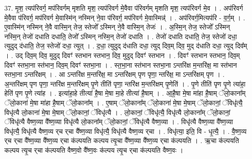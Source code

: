 \documentclass[17pt]{extarticle}
\begin{document}
37. मृ॒श॒ त्यप॑रिवर्ग॒ मप॑रिवर्गम् मृशति मृश॒ त्यप॑रिवर्ग मे॒वैवा प॑रिवर्गम् मृशति मृश॒ त्यप॑रिवर्ग मे॒व । . अप॑रिवर्ग मे॒वैवा प॑रिवर्ग॒ मप॑रिवर्ग मे॒वास्मि॑न् नस्मिन् ने॒वा प॑रिवर्ग॒ मप॑रिवर्ग मे॒वास्मिन्न्॑ । . अप॑रिवर्ग॒मित्यप॑रि - व॒र्ग॒म् । . ए॒वास्मि॑न् नस्मिन् ने॒वै वास्मि॒न् तेज॒ स्तेजो᳚ ऽस्मिन् ने॒वै वास्मि॒न् तेजः॑ । . अ॒स्मि॒न् तेज॒ स्तेजो᳚ ऽस्मिन् नस्मि॒न् तेजो॑ दधाति दधाति॒ तेजो᳚ ऽस्मिन् नस्मि॒न् तेजो॑ दधाति । . तेजो॑ दधाति दधाति॒ तेज॒ स्तेजो॑ दधा॒ त्युदुद् द॑धाति॒ तेज॒ स्तेजो॑ दधा॒ त्युत् । . द॒धा॒ त्युदुद् द॑धाति दधा॒ त्युद् दिव॒म् दिव॒ मुद् द॑धाति दधा॒ त्युद् दिव᳚म् । . उद् दिव॒म् दिव॒ मुदुद् दिवꣳ॑ स्तभान स्तभान॒ दिव॒ मुदुद् दिवꣳ॑ स्तभान । . दिवꣳ॑ स्तभान स्तभान॒ दिव॒म् दिवꣳ॑ स्तभा॒ना स्त॑भान॒ दिव॒म् दिवꣳ॑ स्तभा॒ना । . स्त॒भा॒ना स्त॑भान स्तभा॒ना ऽन्तरि॑क्ष म॒न्तरि॑क्ष॒ मा स्त॑भान स्तभा॒ना ऽन्तरि॑क्षम् । . आ ऽन्तरि॑क्ष म॒न्तरि॑क्ष॒ मा ऽन्तरि॑क्षम् पृण पृणा॒ न्तरि॑क्ष॒ मा ऽन्तरि॑क्षम् पृण । . अ॒न्तरि॑क्षम् पृण पृणा॒ न्तरि॑क्ष म॒न्तरि॑क्षम् पृ॒णे तीति॑ पृणा॒ न्तरि॑क्ष म॒न्तरि॑क्षम् पृ॒णेति॑ । . पृ॒णे तीति॑ पृण पृ॒णे त्या॑हा॒ हेति॑ पृण पृ॒णे त्या॑ह । . इत्या॑हा॒हे तीत्या॑ है॒षा मे॒षा मा॒हे तीत्या॑ है॒षाम् । . आ॒है॒षा मे॒षा मा॑हा है॒षाम् ॅलो॒काना᳚म् ॅलो॒काना॑ मे॒षा मा॑हा है॒षाम् ॅलो॒काना᳚म् । . ए॒षाम् ॅलो॒काना᳚म् ॅलो॒काना॑ मे॒षा मे॒षाम् ॅलो॒कानां॒ ॅविधृ॑त्यै॒ विधृ॑त्यै लो॒काना॑ मे॒षा मे॒षाम् ॅलो॒कानां॒ ॅविधृ॑त्यै । . लो॒कानां॒ ॅविधृ॑त्यै॒ विधृ॑त्यै लो॒काना᳚म् ॅलो॒कानां॒ ॅविधृ॑त्यै वैष्ण॒व्या वै᳚ष्ण॒व्या विधृ॑त्यै लो॒काना᳚म् ॅलो॒कानां॒ ॅविधृ॑त्यै वैष्ण॒व्या । . विधृ॑त्यै वैष्ण॒व्या वै᳚ष्ण॒व्या विधृ॑त्यै॒ विधृ॑त्यै वैष्ण॒व्य र्‌च र्‌चा वै᳚ष्ण॒व्या विधृ॑त्यै॒ विधृ॑त्यै वैष्ण॒व्य र्‌चा । . विधृ॑त्या॒ इति॒ वि - धृ॒त्यै॒ । . वै॒ष्ण॒व्य र्‌च र्‌चा वै᳚ष्ण॒व्या वै᳚ष्ण॒व्य र्‌चा क॑ल्पयति कल्पय त्यृ॒चा वै᳚ष्ण॒व्या वै᳚ष्ण॒व्य र्‌चा क॑ल्पयति । . ऋ॒चा क॑ल्पयति कल्पय त्यृ॒च र्‌चा क॑ल्पयति वैष्ण॒वो वै᳚ष्ण॒वः क॑ल्पय त्यृ॒च र्‌चा क॑ल्पयति वैष्ण॒वः । \newline
\pagebreak
{}
\end{document}
